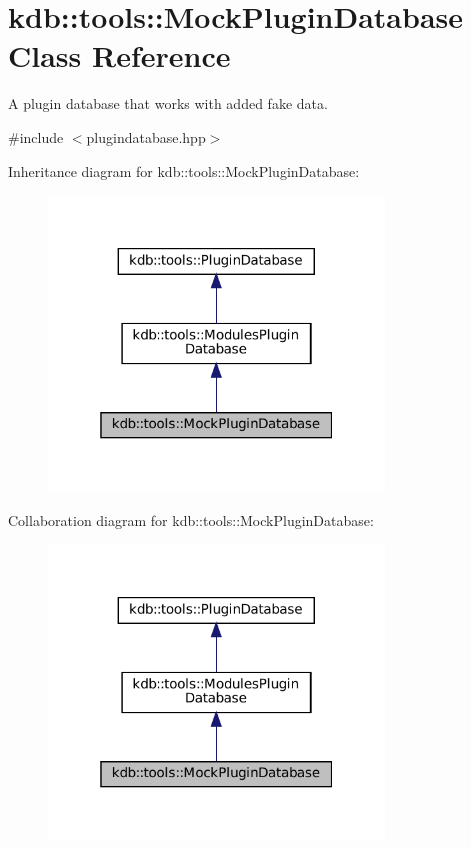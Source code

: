 \hypertarget{classkdb_1_1tools_1_1MockPluginDatabase}{}\section{kdb\+::tools\+::Mock\+Plugin\+Database Class Reference}
\label{classkdb_1_1tools_1_1MockPluginDatabase}


A plugin database that works with added fake data.  




{\ttfamily \#include $<$plugindatabase.\+hpp$>$}



Inheritance diagram for kdb\+::tools\+::Mock\+Plugin\+Database\+:
\nopagebreak
\begin{figure}[H]
\begin{center}
\leavevmode
\includegraphics[width=253pt]{classkdb_1_1tools_1_1MockPluginDatabase__inherit__graph}
\end{center}
\end{figure}


Collaboration diagram for kdb\+::tools\+::Mock\+Plugin\+Database\+:
\nopagebreak
\begin{figure}[H]
\begin{center}
\leavevmode
\includegraphics[width=253pt]{classkdb_1_1tools_1_1MockPluginDatabase__coll__graph}
\end{center}
\end{figure}
